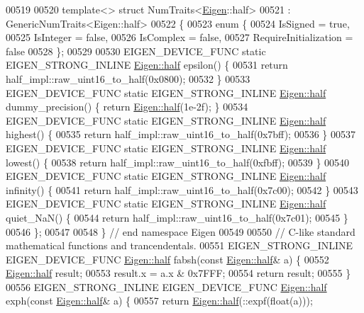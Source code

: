 \begin{DoxyCode}
00519 
00520 \textcolor{keyword}{template}<> \textcolor{keyword}{struct }NumTraits<\hyperlink{namespace_eigen}{Eigen}::half>
00521     : GenericNumTraits<Eigen::half>
00522 \{
00523   \textcolor{keyword}{enum} \{
00524     IsSigned = \textcolor{keyword}{true},
00525     IsInteger = \textcolor{keyword}{false},
00526     IsComplex = \textcolor{keyword}{false},
00527     RequireInitialization = \textcolor{keyword}{false}
00528   \};
00529 
00530   EIGEN\_DEVICE\_FUNC \textcolor{keyword}{static} EIGEN\_STRONG\_INLINE \hyperlink{struct_eigen_1_1half}{Eigen::half} epsilon() \{
00531     \textcolor{keywordflow}{return} half\_impl::raw\_uint16\_to\_half(0x0800);
00532   \}
00533   EIGEN\_DEVICE\_FUNC \textcolor{keyword}{static} EIGEN\_STRONG\_INLINE \hyperlink{struct_eigen_1_1half}{Eigen::half} dummy\_precision() \{ \textcolor{keywordflow}{return} 
      \hyperlink{struct_eigen_1_1half}{Eigen::half}(1e-2f); \}
00534   EIGEN\_DEVICE\_FUNC \textcolor{keyword}{static} EIGEN\_STRONG\_INLINE \hyperlink{struct_eigen_1_1half}{Eigen::half} highest() \{
00535     \textcolor{keywordflow}{return} half\_impl::raw\_uint16\_to\_half(0x7bff);
00536   \}
00537   EIGEN\_DEVICE\_FUNC \textcolor{keyword}{static} EIGEN\_STRONG\_INLINE \hyperlink{struct_eigen_1_1half}{Eigen::half} lowest() \{
00538     \textcolor{keywordflow}{return} half\_impl::raw\_uint16\_to\_half(0xfbff);
00539   \}
00540   EIGEN\_DEVICE\_FUNC \textcolor{keyword}{static} EIGEN\_STRONG\_INLINE \hyperlink{struct_eigen_1_1half}{Eigen::half} infinity() \{
00541     \textcolor{keywordflow}{return} half\_impl::raw\_uint16\_to\_half(0x7c00);
00542   \}
00543   EIGEN\_DEVICE\_FUNC \textcolor{keyword}{static} EIGEN\_STRONG\_INLINE \hyperlink{struct_eigen_1_1half}{Eigen::half} quiet\_NaN() \{
00544     \textcolor{keywordflow}{return} half\_impl::raw\_uint16\_to\_half(0x7c01);
00545   \}
00546 \};
00547 
00548 \} \textcolor{comment}{// end namespace Eigen}
00549 
00550 \textcolor{comment}{// C-like standard mathematical functions and trancendentals.}
00551 EIGEN\_STRONG\_INLINE EIGEN\_DEVICE\_FUNC \hyperlink{struct_eigen_1_1half}{Eigen::half} fabsh(\textcolor{keyword}{const} 
      \hyperlink{struct_eigen_1_1half}{Eigen::half}& a) \{
00552   \hyperlink{struct_eigen_1_1half}{Eigen::half} result;
00553   result.x = a.x & 0x7FFF;
00554   \textcolor{keywordflow}{return} result;
00555 \}
00556 EIGEN\_STRONG\_INLINE EIGEN\_DEVICE\_FUNC \hyperlink{struct_eigen_1_1half}{Eigen::half} exph(\textcolor{keyword}{const} 
      \hyperlink{struct_eigen_1_1half}{Eigen::half}& a) \{
00557   \textcolor{keywordflow}{return} \hyperlink{struct_eigen_1_1half}{Eigen::half}(::expf(\textcolor{keywordtype}{float}(a)));

\end{DoxyCode}

